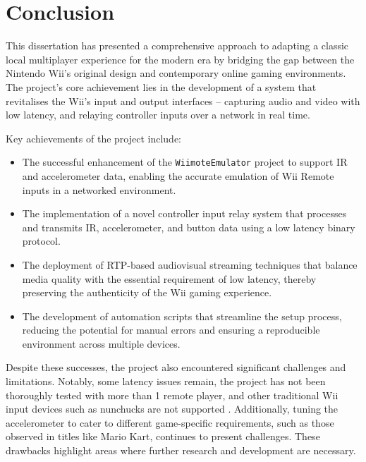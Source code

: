 \chapter{Conclusion}
\label{chapter:conclusion}

This dissertation has presented a comprehensive approach to adapting a classic local multiplayer experience for the modern era by bridging the gap between the Nintendo Wii’s original design and contemporary online gaming environments. The project’s core achievement lies in the development of a system that revitalises the Wii’s input and output interfaces -- capturing audio and video with low latency, and relaying controller inputs over a network in real time.

Key achievements of the project include:
\begin{itemize}
    \item The successful enhancement of the \texttt{WiimoteEmulator} project to support IR and accelerometer data, enabling the accurate emulation of Wii Remote inputs in a networked environment.
    \item The implementation of a novel controller input relay system that processes and transmits IR, accelerometer, and button data using a low latency binary protocol.
    \item The deployment of RTP-based audiovisual streaming techniques that balance media quality with the essential requirement of low latency, thereby preserving the authenticity of the Wii gaming experience.
    \item The development of automation scripts that streamline the setup process, reducing the potential for manual errors and ensuring a reproducible environment across multiple devices.
\end{itemize}

Despite these successes, the project also encountered significant challenges and limitations. Notably, some latency issues remain, the project has not been thoroughly tested with more than 1 remote player, and other traditional Wii input devices such as nunchucks are not supported . Additionally, tuning the accelerometer to cater to different game-specific requirements, such as those observed in titles like Mario Kart, continues to present challenges. These drawbacks highlight areas where further research and development are necessary.

